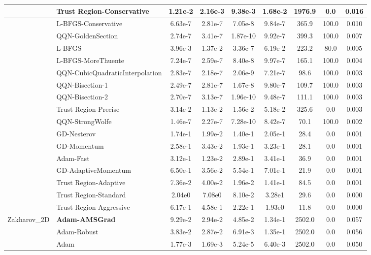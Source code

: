 \documentclass[10pt]{article}
\begin{document}
\begin{longtable}{|l|l|c|c|c|c|c|c|c|}
\hline
 & Trust Region-Conservative & 1.21e-2 & 2.16e-3 & 9.38e-3 & 1.68e-2 & 1976.9 & 0.0 & 0.016 \\
\hline
 & L-BFGS-Conservative & 6.63e-7 & 2.81e-7 & 7.05e-8 & 9.84e-7 & 365.9 & 100.0 & 0.010 \\
\hline
 & QQN-GoldenSection & 2.74e-7 & 3.41e-7 & 1.87e-10 & 9.92e-7 & 399.3 & 100.0 & 0.007 \\
\hline
 & L-BFGS & 3.96e-3 & 1.37e-2 & 3.36e-7 & 6.19e-2 & 223.2 & 80.0 & 0.005 \\
\hline
 & L-BFGS-MoreThuente & 7.24e-7 & 2.59e-7 & 8.40e-8 & 9.97e-7 & 165.1 & 100.0 & 0.004 \\
\hline
 & QQN-CubicQuadraticInterpolation & 2.83e-7 & 2.18e-7 & 2.06e-9 & 7.21e-7 & 98.6 & 100.0 & 0.003 \\
\hline
 & QQN-Bisection-1 & 2.49e-7 & 2.81e-7 & 1.67e-8 & 9.80e-7 & 109.7 & 100.0 & 0.003 \\
\hline
 & QQN-Bisection-2 & 2.70e-7 & 3.13e-7 & 1.96e-10 & 9.48e-7 & 111.1 & 100.0 & 0.003 \\
\hline
 & Trust Region-Precise & 3.14e-2 & 1.13e-2 & 1.56e-2 & 5.18e-2 & 325.6 & 0.0 & 0.003 \\
\hline
 & QQN-StrongWolfe & 1.46e-7 & 2.27e-7 & 7.28e-10 & 8.42e-7 & 70.1 & 100.0 & 0.002 \\
\hline
 & GD-Nesterov & 1.74e-1 & 1.99e-2 & 1.40e-1 & 2.05e-1 & 28.4 & 0.0 & 0.001 \\
\hline
 & GD-Momentum & 2.58e-1 & 3.43e-2 & 1.93e-1 & 3.23e-1 & 28.1 & 0.0 & 0.001 \\
\hline
 & Adam-Fast & 3.12e-1 & 1.23e-2 & 2.89e-1 & 3.41e-1 & 36.9 & 0.0 & 0.001 \\
\hline
 & GD-AdaptiveMomentum & 6.50e-1 & 3.56e-2 & 5.54e-1 & 7.01e-1 & 21.9 & 0.0 & 0.001 \\
\hline
 & Trust Region-Adaptive & 7.36e-2 & 4.00e-2 & 1.96e-2 & 1.41e-1 & 84.5 & 0.0 & 0.001 \\
\hline
 & Trust Region-Standard & 2.04e0 & 7.08e0 & 8.10e-2 & 3.28e1 & 29.6 & 0.0 & 0.000 \\
\hline
 & Trust Region-Aggressive & 6.17e-1 & 4.58e-1 & 2.22e-1 & 1.93e0 & 11.8 & 0.0 & 0.000 \\
Zakharov\_2D & \textbf{Adam-AMSGrad} & 9.29e-2 & 2.94e-2 & 4.85e-2 & 1.34e-1 & 2502.0 & 0.0 & 0.057 \\
\hline
 & Adam-Robust & 3.83e-2 & 2.87e-2 & 6.91e-3 & 1.35e-1 & 2502.0 & 0.0 & 0.056 \\
\hline
 & Adam & 1.77e-3 & 1.69e-3 & 5.24e-5 & 6.40e-3 & 2502.0 & 0.0 & 0.050 \\

\end{longtable}
\end{document}
